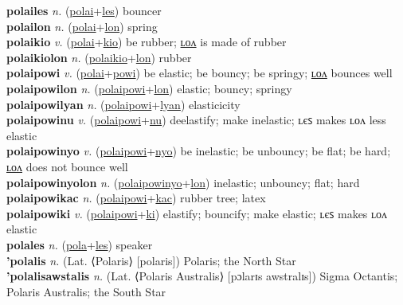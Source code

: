 \textbf{polailes} \textit{n.} (\hyperref[polai]{polai}+\hyperref[les]{les})
bouncer \label{polailes} \\
\textbf{polailon} \textit{n.} (\hyperref[polai]{polai}+\hyperref[lon]{lon})
spring \label{polailon} \\
\textbf{polaikio} \textit{v.} (\hyperref[polai]{polai}+\hyperref[kio]{kio})
be rubber; \hyperref[polaikiolon]{ʟᴏᴧ} is made of rubber \label{polaikio} \\
\textbf{polaikiolon} \textit{n.} (\hyperref[polaikio]{polaikio}+\hyperref[lon]{lon})
rubber \label{polaikiolon} \\
\textbf{polaipowi} \textit{v.} (\hyperref[polai]{polai}+\hyperref[powi]{powi})
be elastic; be bouncy; be springy; \hyperref[polaipowilon]{ʟᴏᴧ} bounces well \label{polaipowi} \\
\textbf{polaipowilon} \textit{n.} (\hyperref[polaipowi]{polaipowi}+\hyperref[lon]{lon})
elastic; bouncy; springy \label{polaipowilon} \\
\textbf{polaipowilyan} \textit{n.} (\hyperref[polaipowi]{polaipowi}+\hyperref[lyan]{lyan})
elasticicity \label{polaipowilyan} \\
\textbf{polaipowinu} \textit{v.} (\hyperref[polaipowi]{polaipowi}+\hyperref[nu]{nu})
deelastify; make inelastic; ʟєꜱ makes ʟᴏᴧ less elastic \label{polaipowinu} \\
\textbf{polaipowinyo} \textit{v.} (\hyperref[polaipowi]{polaipowi}+\hyperref[nyo]{nyo})
be inelastic; be unbouncy; be flat; be hard; \hyperref[polaipowinyolon]{ʟᴏᴧ} does not bounce well \label{polaipowinyo} \\
\textbf{polaipowinyolon} \textit{n.} (\hyperref[polaipowinyo]{polaipowinyo}+\hyperref[lon]{lon})
inelastic; unbouncy; flat; hard \label{polaipowinyolon} \\
\textbf{polaipowikac} \textit{n.} (\hyperref[polaipowi]{polaipowi}+\hyperref[kac]{kac})
rubber tree; latex \label{polaipowikac} \\
\textbf{polaipowiki} \textit{v.} (\hyperref[polaipowi]{polaipowi}+\hyperref[ki]{ki})
elastify; bouncify; make elastic; ʟєꜱ makes ʟᴏᴧ elastic \label{polaipowiki} \\
\textbf{polales} \textit{n.} (\hyperref[pola]{pola}+\hyperref[les]{les})
speaker \label{polales} \\
\textbf{'polalis} \textit{n.} (Lat. ⟨Polaris⟩ [polaris])
Polaris; the North Star \label{'polalis} \\
\textbf{'polalisawstalis} \textit{n.} (Lat. ⟨Polaris Australis⟩ [pɔlarɪs awstralɪs])
Sigma Octantis; Polaris Australis; the South Star \label{'polalisawstalis} \\
